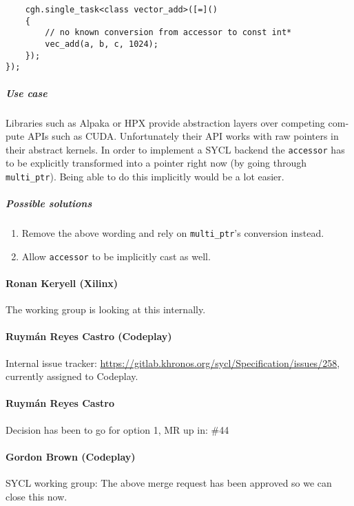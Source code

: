 \begin{otherlanguage}{english}
\begin{code}
\begin{verbatim}
    cgh.single_task<class vector_add>([=]()
    {
        // no known conversion from accessor to const int*
        vec_add(a, b, c, 1024);
    });
});
                                \end{verbatim}
                            \end{code}
                            \subparagraph{Use case}
                            Libraries such as Alpaka or HPX provide abstraction
                            layers over competing compute APIs such as CUDA.
                            Unfortunately their API works with raw pointers in
                            their abstract kernels. In order to implement a SYCL
                            backend the \texttt{accessor} has to be explicitly
                            transformed into a pointer right now (by going
                            through \texttt{multi\_ptr}). Being able to do this
                            implicitly would be a lot easier.
                            \subparagraph{Possible solutions}
                            \begin{enumerate}
                                \item Remove the above wording and rely on
                                      \texttt{multi\_ptr}'s conversion instead.
                                \item Allow \texttt{accessor} to be implicitly
                                      cast as well.
                            \end{enumerate}
    \paragraph{Ronan Keryell (Xilinx)} The working group is looking at this
                                       internally.
    \paragraph{Ruymán Reyes Castro (Codeplay)} Internal issue tracker: \url{https://gitlab.khronos.org/sycl/Specification/issues/258},
                                               currently assigned to Codeplay.
    \paragraph{Ruymán Reyes Castro} Decision has been to go for option 1, MR up
                                    in: \#44
    \paragraph{Gordon Brown (Codeplay)} SYCL working group: The above merge
                                        request has been approved so we can
                                        close this now.
\end{otherlanguage}

